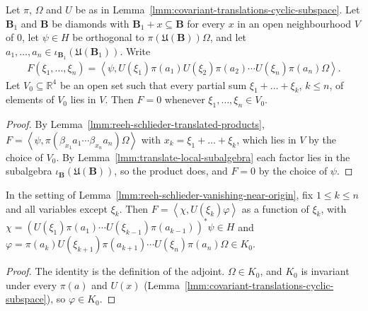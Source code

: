 \begin{lemma}
    \label{lmm:reeh-schlieder-vanishing-near-origin}
    \leanok
    Let $\pi$, $\Omega$ and $U$ be as in Lemma~\ref{lmm:covariant-translations-cyclic-subspace}. Let $\mathbf{B}_1$ and $\mathbf{B}$ be diamonds with $\mathbf{B}_1 + x \subseteq \mathbf{B}$ for every $x$ in an open neighbourhood $V$ of $0$, let $\psi \in H$ be orthogonal to $\pi(\mathfrak{U}(\mathbf{B}))\Omega$, and let $a_1, \dots, a_n \in \iota_{\mathbf{B}_1}(\mathfrak{U}(\mathbf{B}_1))$. Write
    \begin{align}
        F(\xi_1, \dots, \xi_n) = \left< \psi, U(\xi_1)\pi(a_1)U(\xi_2)\pi(a_2) \cdots U(\xi_n)\pi(a_n)\Omega \right>.
    \end{align}
    Let $V_0 \subseteq \mathbb{R}^4$ be an open set such that every partial sum $\xi_1 + \dots + \xi_k$, $k \le n$, of elements of $V_0$ lies in $V$. Then $F = 0$ whenever $\xi_1, \dots, \xi_n \in V_0$.
\end{lemma}
\begin{proof}
    \leanok
    By Lemma~\ref{lmm:reeh-schlieder-translated-products}, $F = \left< \psi, \pi(\beta_{x_1}a_1 \cdots \beta_{x_n}a_n)\Omega \right>$ with $x_k = \xi_1 + \dots + \xi_k$, which lies in $V$ by the choice of $V_0$. By Lemma~\ref{lmm:translate-local-subalgebra} each factor lies in the subalgebra $\iota_{\mathbf{B}}(\mathfrak{U}(\mathbf{B}))$, so the product does, and $F = 0$ by the choice of $\psi$.
\end{proof}

\begin{lemma}
    \label{lmm:reeh-schlieder-factorization}
    \leanok
    In the setting of Lemma~\ref{lmm:reeh-schlieder-vanishing-near-origin}, fix $1 \le k \le n$ and all variables except $\xi_k$. Then $F = \left< \chi, U(\xi_k)\varphi \right>$ as a function of $\xi_k$, with $\chi = (U(\xi_1)\pi(a_1) \cdots U(\xi_{k-1})\pi(a_{k-1}))^*\psi \in H$ and $\varphi = \pi(a_k)U(\xi_{k+1})\pi(a_{k+1}) \cdots U(\xi_n)\pi(a_n)\Omega \in K_0$.
\end{lemma}
\begin{proof}
    \leanok
    The identity is the definition of the adjoint. $\Omega \in K_0$, and $K_0$ is invariant under every $\pi(a)$ and $U(x)$ (Lemma~\ref{lmm:covariant-translations-cyclic-subspace}), so $\varphi \in K_0$.
\end{proof}

